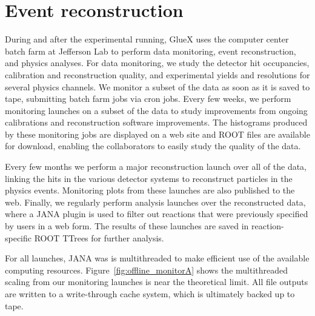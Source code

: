 

\section[Event reconstruction]{Event reconstruction \label{sec:reconstruction}}


During and after the experimental running, GlueX uses the computer center batch farm at Jefferson Lab to perform data monitoring, event reconstruction, and physics analyses.  For data monitoring, we study the detector hit occupancies, calibration and reconstruction quality, and experimental yields and resolutions for several physics channels.  We monitor a subset of the data as soon as it is saved to tape, submitting batch farm jobs via cron jobs.  Every few weeks, we perform monitoring launches on a subset of the data to study improvements from ongoing calibrations and reconstruction software improvements.  The histograms produced by these monitoring jobs are displayed on a web site and ROOT files are available for download, enabling the collaborators to easily study the quality of the data. 

Every few months we perform a major reconstruction launch over all of the data, linking the hits in the various detector systems to reconstruct particles in the physics events.  Monitoring plots from these launches are also published to the web. Finally, we regularly perform analysis launches over the reconstructed data, where a JANA plugin is used to filter out reactions that were previously specified by users in a web form. The results of these launches are saved in reaction-specific ROOT TTrees for further analysis.

For all launches, JANA was is multithreaded to make efficient use of the available computing resources. Figure~\ref{fig:offline_monitorA} shows the multithreaded scaling from our monitoring launches is near the theoretical limit.  
All file outputs are written to a write-through cache system, which is ultimately backed up to tape.

